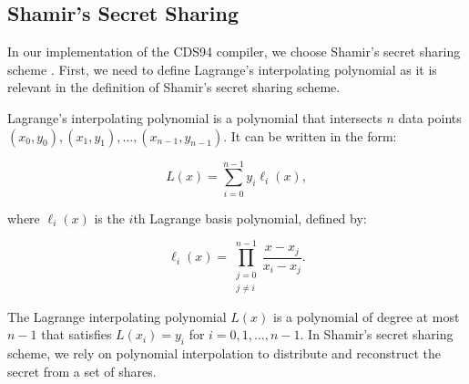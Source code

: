 \subsection{Shamir's Secret Sharing}\label{sec:sss}
In our implementation of the CDS94 compiler, we choose Shamir's secret sharing scheme 
\cite{DBLP:journals/cacm/Shamir79}. First, we need to define Lagrange's interpolating polynomial 
as it is relevant in the definition of Shamir's secret sharing scheme.

\begin{definition}\label{def:lagrange}
    Lagrange's interpolating polynomial is a polynomial that intersects $n$ data points $(x_0, y_0), (x_1, y_1), \ldots, (x_{n-1}, y_{n-1})$. It can be written in the 
    form:
    
    $$
    L(x) = \sum_{i=0}^{n-1} y_i \ell_i(x),
    $$
    
    where $\ell_i(x)$ is the $i$th Lagrange basis polynomial, defined by:
    
    $$
    \ell_i(x) = \prod_{\substack{j=0 \\ j\neq i}}^{n-1} \frac{x - x_j}{x_i - x_j}.
    $$
    
    The Lagrange interpolating polynomial $L(x)$ is a polynomial of degree at most 
    $n-1$ that satisfies $L(x_i) = y_i$ for $i = 0, 1, \ldots, n-1$. In Shamir's secret sharing 
    scheme, we rely on polynomial interpolation to distribute and 
    reconstruct the secret from a set of shares. 
\end{definition}

